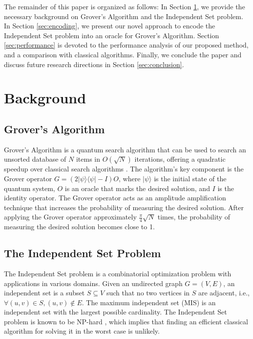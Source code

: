 The remainder of this paper is organized as follows: In Section \ref{sec:background}, we provide the necessary background on Grover's Algorithm and the Independent Set problem. In Section \ref{sec:encoding}, we present our novel approach to encode the Independent Set problem into an oracle for Grover's Algorithm. Section \ref{sec:performance} is devoted to the performance analysis of our proposed method, and a comparison with classical algorithms. Finally, we conclude the paper and discuss future research directions in Section \ref{sec:conclusion}.

\section{Background} \label{sec:background}

\subsection{Grover's Algorithm}

Grover's Algorithm is a quantum search algorithm that can be used to search an unsorted database of $N$ items in $O(\sqrt{N})$ iterations, offering a quadratic speedup over classical search algorithms \cite{grover1996}. The algorithm's key component is the Grover operator $G = (2|\psi\rangle\langle\psi| - I)O$, where $|\psi\rangle$ is the initial state of the quantum system, $O$ is an oracle that marks the desired solution, and $I$ is the identity operator. The Grover operator acts as an amplitude amplification technique that increases the probability of measuring the desired solution. After applying the Grover operator approximately $\frac{\pi}{4}\sqrt{N}$ times, the probability of measuring the desired solution becomes close to 1.

\subsection{The Independent Set Problem}

The Independent Set problem is a combinatorial optimization problem with applications in various domains. Given an undirected graph $G = (V, E)$, an independent set is a subset $S \subseteq V$ such that no two vertices in $S$ are adjacent, i.e., $\forall (u, v) \in S, (u, v) \notin E$. The maximum independent set (MIS) is an independent set with the largest possible cardinality. The Independent Set problem is known to be NP-hard \cite{karp1972}, which implies that finding an efficient classical algorithm for solving it in the worst case is unlikely.

